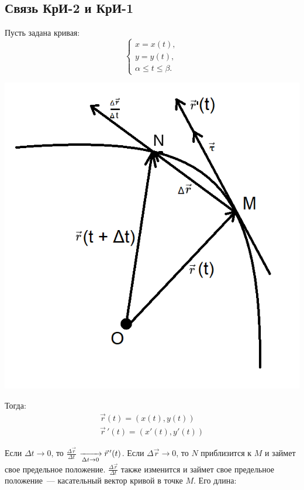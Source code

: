 \documentclass[../../main.tex]{subfiles}
\begin{document}
	\subsection{Связь КрИ-2 и КрИ-1}
	
	Пусть задана кривая:
	\[
	\begin{cases}
	x = x(t),\\
	y = y(t),\\
	\alpha \leq t \leq \beta.
	\end{cases}
	\]
	
	\begin{center}
		\includegraphics[scale = 0.8]{lec20_1.png}
	\end{center}
	
	Тогда:
	\begin{gather*}
	\vec r(t) = \left( x(t), y(t) \right) \\
	\vec r\,'(t) = \left( x'(t), y'(t) \right)
	\end{gather*}
	
	Если $\Delta t \to 0$, то $\frac{\Delta \vec{r}}{\Delta t}$
	$ \xrightarrow[\Delta t \to 0]{}
	\vec{r}\,'(t)$.
	Если $\Delta \vec{r} \to 0$, то $N$ приблизится к $M$
	и займет свое предельное положение.
	$\frac{\Delta \vec{r}}{\Delta t}$ также изменится и займет 
	свое предельное положение~--- касательный вектор кривой в точке $M$. Его 
	длина:
	
\end{document}
